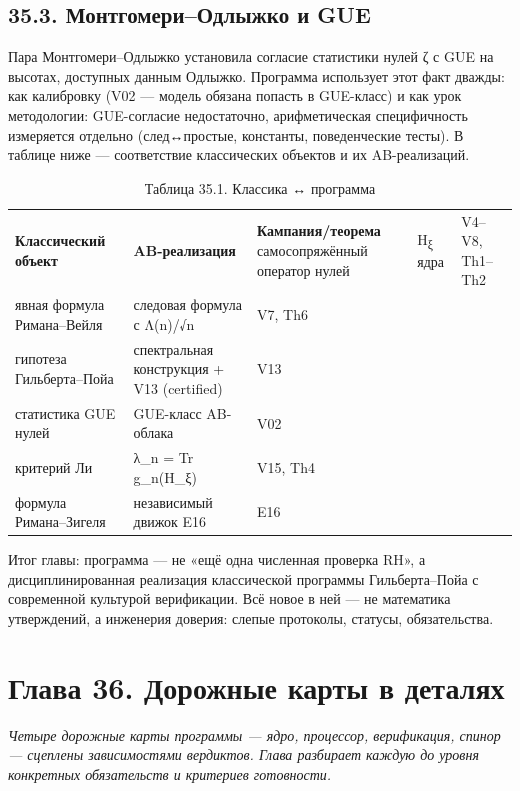 \documentclass[11pt,a4paper]{article}
\begin{document}
\subsection{35.3. Монтгомери–Одлыжко и GUE}

Пара Монтгомери–Одлыжко установила согласие статистики нулей ζ с GUE на высотах, доступных данным Одлыжко. Программа использует этот факт дважды: как калибровку (V02 — модель обязана попасть в GUE-класс) и как урок методологии: GUE-согласие недостаточно, арифметическая специфичность измеряется отдельно (след↔простые, константы, поведенческие тесты). В таблице ниже — соответствие классических объектов и их AB-реализаций.

\begin{table}[htbp]\centering\small
\caption{Таблица 35.1. Классика ↔ программа}
\begin{tabular}{p{} p{} p{}}
\toprule
\textbf{Классический объект} & \textbf{AB-реализация} & \textbf{Кампания/теорема}
\midrule
самосопряжённый оператор нулей & H\textsubscript{ξ} ядра & V4–V8, Th1–Th2 \\
явная формула Римана–Вейля & следовая формула с Λ(n)/√n & V7, Th6 \\
гипотеза Гильберта–Пойа & спектральная конструкция + V13 (certified) & V13 \\
статистика GUE нулей & GUE-класс AB-облака & V02 \\
критерий Ли & λ\_n = Tr g\_n(H\_ξ) & V15, Th4 \\
формула Римана–Зигеля & независимый движок E16 & E16 \\
\bottomrule
\end{tabular}
\end{table}

Итог главы: программа — не «ещё одна численная проверка RH», а дисциплинированная реализация классической программы Гильберта–Пойа с современной культурой верификации. Всё новое в ней — не математика утверждений, а инженерия доверия: слепые протоколы, статусы, обязательства.

\section{Глава 36. Дорожные карты в деталях}

\noindent\textit{\color{copper}Четыре дорожные карты программы — ядро, процессор, верификация, спинор — сцеплены зависимостями вердиктов. Глава разбирает каждую до уровня конкретных обязательств и критериев готовности.}
\end{document}
